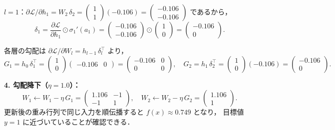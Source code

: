\documentclass[uplatex, dvipdfmx]{jsarticle}
\begin{document}
$l=1$：$\partial\mathcal{L}/\partial h_1 = W_2\,\delta_2
= \begin{pmatrix}1\\1\end{pmatrix}(-0.106)
= \begin{pmatrix}-0.106\\-0.106\end{pmatrix}$ であるから，
\[
\delta_1
= \frac{\partial\mathcal{L}}{\partial h_1}\odot\sigma_1'(a_1)
= \begin{pmatrix}-0.106\\-0.106\end{pmatrix}\odot\begin{pmatrix}1\\0\end{pmatrix}
= \begin{pmatrix}-0.106\\0\end{pmatrix}.
\]

各層の勾配は $\partial\mathcal{L}/\partial W_l = h_{l-1}\,\delta_l^\top$ より，
\[
G_1 = h_0\,\delta_1^\top
= \begin{pmatrix}1\\0\end{pmatrix}\begin{pmatrix}-0.106 & 0\end{pmatrix}
= \begin{pmatrix}-0.106 & 0\\0 & 0\end{pmatrix},\quad
G_2 = h_1\,\delta_2^\top
= \begin{pmatrix}1\\0\end{pmatrix}(-0.106)
= \begin{pmatrix}-0.106\\0\end{pmatrix}.
\]

\textbf{4. 勾配降下（$\eta=1.0$）：}
\[
W_1 \gets W_1 - \eta\, G_1
= \begin{pmatrix}1.106 & -1\\-1 & 1\end{pmatrix},\quad
W_2 \gets W_2 - \eta\, G_2
= \begin{pmatrix}1.106\\1\end{pmatrix}.
\]
更新後の重み行列で同じ入力を順伝播すると $f(x)\approx 0.749$ となり，
目標値 $y=1$ に近づいていることが確認できる．
\end{document}
